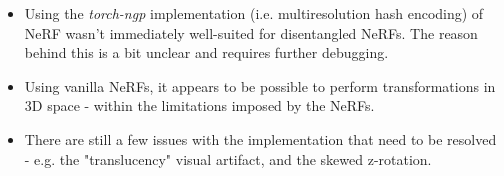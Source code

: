\begin{itemize}[noitemsep]
    \item Using the \textit{torch-ngp} implementation (i.e. multiresolution hash encoding) of NeRF wasn't immediately well-suited for disentangled NeRFs. The reason behind this is a bit unclear and requires further debugging.

    \item Using vanilla NeRFs, it appears to be possible to perform transformations in 3D space - within the limitations imposed by the NeRFs.
    
    \item There are still a few issues with the implementation that need to be resolved - e.g. the "translucency" visual artifact, and the skewed z-rotation.
\end{itemize}
